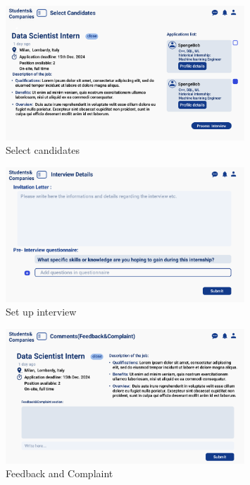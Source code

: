 \begin{figure}[H]
    \centering
    \includegraphics[width=0.8\textwidth]{Images/UI/Select candidates.png}
    \caption{Select candidates}\label{fig:Select candidates}
\end{figure}

\begin{figure}[H]
    \centering
    \includegraphics[width=0.8\textwidth]{Images/UI/Set Interview-Company.png}
    \caption{Set up interview}\label{fig:Set up interview}
\end{figure}

\begin{figure}
    \centering
    \includegraphics[width=0.8\textwidth]{Images/UI/FeedBack&Complaint- Student & Company.png}
    \caption{Feedback and Complaint}\label{fig:Feedback and Complaint}
\end{figure}


